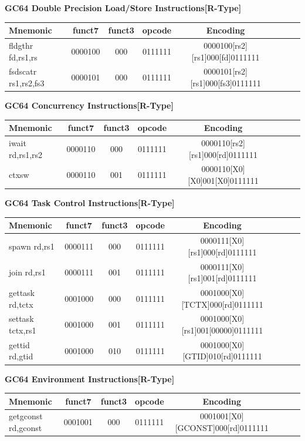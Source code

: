 \documentclass{article}
\begin{document}
\begin{center}
\begin{small}
\textbf{GC64 Double Precision Load/Store Instructions[R-Type]}
\begin{tabular}{| l | c | c | c | c | c | c || r}
\hline
Mnemonic & funct7 & funct3 & opcode & Encoding \\ \hline
\hline
fldgthr fd,rs1,rs & 0000100 & 000 & 0111111 & 0000100[rs2][rs1]000[fd]0111111 \\ 
\hline
fsdscatr rs1,rs2,fs3 & 0000101 & 000 & 0111111 & 0000101[rs2][rs1]000[fs3]0111111 \\ 
\hline
\end{tabular}

\vspace{10 mm}

\textbf{GC64 Concurrency Instructions[R-Type]}
\begin{tabular}{| l | c | c | c | c | c | c || r}
\hline
Mnemonic & funct7 & funct3 & opcode & Encoding \\ \hline
\hline
iwait rd,rs1,rs2 & 0000110 & 000 & 0111111 & 0000110[rs2][rs1]000[rd]0111111 \\ 
\hline
ctxsw & 0000110 & 001 & 0111111 & 0000110[X0][X0]001[X0]0111111 \\ 
\hline
\end{tabular}

\vspace{10 mm}

\textbf{GC64 Task Control Instructions[R-Type]}
\begin{tabular}{| l | c | c | c | c | c | c || r}
\hline
Mnemonic & funct7 & funct3 & opcode & Encoding \\ \hline
\hline
spawn rd,rs1 & 0000111 & 000 & 0111111 & 0000111[X0][rs1]000[rd]0111111 \\ 
\hline
join rd,rs1 & 0000111 & 001 & 0111111 & 0000111[X0][rs1]001[rd]0111111 \\ 
\hline
gettask rd,tctx & 0001000 & 000 & 0111111 & 0001000[X0][TCTX]000[rd]0111111 \\ 
\hline
settask tctx,rs1 & 0001000 & 001 & 0111111 & 0001000[X0][rs1]001[00000]0111111 \\ 
\hline
gettid rd,gtid & 0001000 & 010 & 0111111 & 0001000[X0][GTID]010[rd]0111111 \\ 
\hline
\end{tabular}

\vspace{10 mm}

\textbf{GC64 Environment Instructions[R-Type]}
\begin{tabular}{| l | c | c | c | c | c | c || r}
\hline
Mnemonic & funct7 & funct3 & opcode & Encoding \\ \hline
\hline
getgconst rd,gconst & 0001001 & 000 & 0111111 & 0001001[X0][GCONST]000[rd]0111111 \\ 
\hline
\end{tabular}


\end{small}
\end{center}
\end{document}
